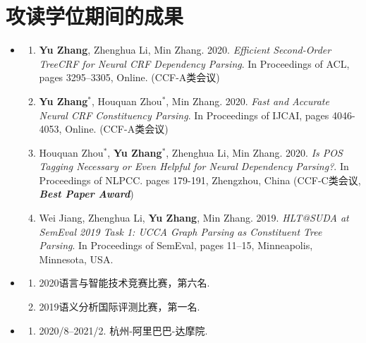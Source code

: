 \chapter{攻读学位期间的成果}

\begin{itemize}
	\setlength{\itemsep}{5pt}
	
	\item \textbf{\heiti{}}
	      \begin{enumerate}
	      	\setlength{\itemsep}{-\itemsep}  %
	      	
	      	\item \textbf{Yu Zhang}, Zhenghua Li, Min Zhang. 2020.
	      	      \emph{Efficient Second-Order TreeCRF for Neural CRF Dependency Parsing}.
	      	      In Proceedings of ACL, pages 3295–3305, Online. (CCF-A类会议)
	      	      
	      	\item \textbf{Yu Zhang}$^\ast$, Houquan Zhou$^\ast$, Min Zhang. 2020.
	      	      \emph{Fast and Accurate Neural CRF Constituency Parsing}.
	      	      In Proceedings of IJCAI, pages 4046-4053, Online. (CCF-A类会议)
	      	      
	      	\item Houquan Zhou$^\ast$, \textbf{Yu Zhang}$^\ast$, Zhenghua Li, Min Zhang. 2020.
	      	      \emph{Is POS Tagging Necessary or Even Helpful for Neural Dependency Parsing?}.
	      	      In Proceedings of NLPCC. pages 179-191, Zhengzhou, China (CCF-C类会议, \textbf{\textit{Best Paper Award}})
	      	      
	      	\item Wei Jiang, Zhenghua Li, \textbf{Yu Zhang}, Min Zhang. 2019.
	      	      \emph{HLT@SUDA at SemEval 2019 Task 1: UCCA Graph Parsing as Constituent Tree Parsing}.
	      	      In Proceedings of SemEval, pages 11–15, Minneapolis, Minnesota, USA.
	      	      
	      \end{enumerate}
	      
	\item \textbf{\heiti{}}
	      \begin{enumerate}
	      	\item 2020语言与智能技术竞赛比赛，第六名.
	      	\item 2019语义分析国际评测比赛，第一名.
	      \end{enumerate}
	      
	\item \textbf{\heiti{}}
	      \begin{enumerate}
	      	\item \textsc{2020/8--2021/2}. 杭州-阿里巴巴-达摩院.
	      \end{enumerate}
	      
\end{itemize}
